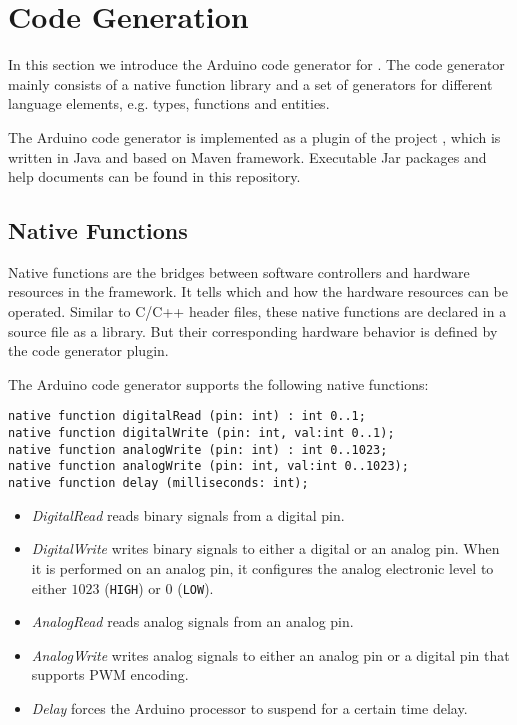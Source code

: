 \section{Code Generation}
\label{sec:codegen}

In this section we introduce the Arduino code generator for \lang{}. The code generator mainly consists of a native function library and a set of generators for different \lang{} language elements, e.g. types, functions and entities.

The Arduino code generator is implemented as a plugin of the \lang{} project \cite{medgit}, which is written in Java and based on Maven framework. Executable Jar packages and help documents can be found in this repository.

\subsection{Native Functions}

Native functions are the bridges between software controllers and hardware resources in the \lang{} framework. It tells \lang{} which and how the hardware resources can be operated. Similar to C/C++ header files, these native functions are declared in a \lang{} source file as a library. But their corresponding hardware behavior is defined by the code generator plugin.

The Arduino code generator supports the following native functions:
\begin{lstlisting}
native function digitalRead (pin: int) : int 0..1;
native function digitalWrite (pin: int, val:int 0..1);
native function analogWrite (pin: int) : int 0..1023;
native function analogWrite (pin: int, val:int 0..1023);
native function delay (milliseconds: int);
\end{lstlisting}
\begin{itemize}
    \item \emph{DigitalRead} reads binary signals from a digital pin.
    \item \emph{DigitalWrite} writes binary signals to either a digital or an analog pin. When it is performed on an analog pin, it configures the analog electronic level to either $1023$ (\texttt{HIGH}) or $0$ (\texttt{LOW}).
    \item \emph{AnalogRead} reads analog signals from an analog pin.
    \item \emph{AnalogWrite} writes analog signals to either an analog pin or a digital pin that supports PWM encoding.
    \item \emph{Delay} forces the Arduino processor to suspend for a certain time delay.
\end{itemize}


